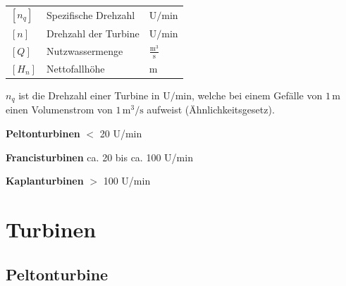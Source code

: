 \vspace{0.15cm}

\renewcommand{\arraystretch}{1.2}
\begin{tabular}{@{} l p{6cm} l @{}}
    $[n_q]$          & Spezifische Drehzahl \dotfill                               & $\text{U/min}$ \\
    $[n]$            & Drehzahl der Turbine \dotfill                               & $\text{U/min}$ \\
    $[Q]$            & Nutzwassermenge \dotfill                                    & $\frac{\text{m}^3}{\text{s}}$ \\
    $[H_n]$          & Nettofallhöhe \dotfill                                      & $\text{m}$ \\
\end{tabular}

\vspace{0.15cm}

$n_q$ ist die Drehzahl einer Turbine in \(\mathrm{U/min}\), welche bei einem Gefälle von \(1 \,\mathrm{m}\) einen Volumenstrom von \(1 \,\mathrm{m}^3/\mathrm{s}\) aufweist (Ähnlichkeitsgesetz).





\vspace{0.15cm}

\textbf{Peltonturbinen} \hspace{1cm} $<$ 20 U/min 

\vspace{0.15cm}

\textbf{Francisturbinen} \hspace{1cm} ca. 20 bis ca. 100 U/min 

\vspace{0.15cm}

\textbf{Kaplanturbinen} \hspace{1cm} $>$ 100 U/min



\newcolumn
\section{Turbinen}

\subsection{Peltonturbine}

